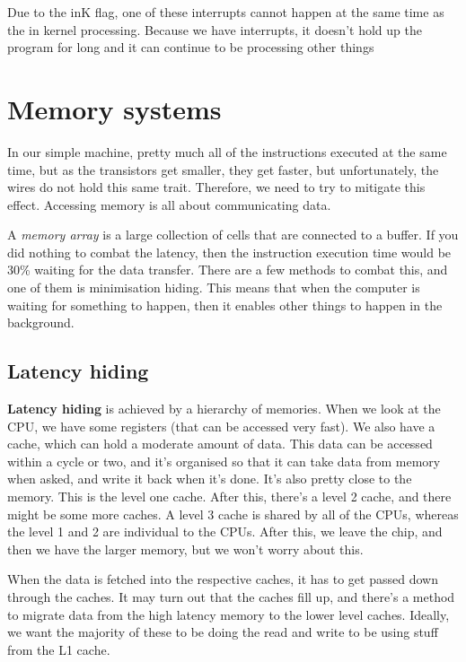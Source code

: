 \documentclass[11pt,a4paper,titlepage,dvipsnames,cmyk]{scrartcl}
\begin{document}
Due to the inK flag, one of these interrupts cannot happen at the same
time as the in kernel processing. Because we have interrupts, it doesn't
hold up the program for long and it can continue to be processing other
things

\section{Memory systems}%
\label{sec:Memory systems}
In our simple machine, pretty much all of the instructions executed at the
same time, but as the transistors get smaller, they get faster, but
unfortunately, the wires do not hold this same trait. Therefore, we need
to try to mitigate this effect. Accessing memory is all about
communicating data.

A \textit{memory array} is a large collection of cells that are connected
to a buffer. If you did nothing to combat the latency, then the
instruction execution time would be 30\% waiting for the data transfer.
There are a few methods to combat this, and one of them is minimisation
hiding. This means that when the computer is waiting for something to
happen, then it enables other things to happen in the background.

\subsection{Latency hiding}%
\label{sub:Latency hiding}

\textbf{Latency hiding} is achieved by a hierarchy of memories. When we
look at the CPU, we have some registers (that can be accessed very fast).
We also have a cache, which can hold a moderate amount of data. This data
can be accessed within a cycle or two, and it's organised so that it can
take data from memory when asked, and write it back when it's done. It's
also pretty close to the memory. This is the level one cache. After this,
there's a level 2 cache, and there might be some more caches. A level 3
cache is shared by all of the CPUs, whereas the level 1 and 2 are
individual to the CPUs. After this, we leave the chip, and then we have
the larger memory, but we won't worry about this.

When the data is fetched into the respective caches, it has to get passed
down through the caches. It may turn out that the caches fill up, and
there's a method to migrate data from the high latency memory to the lower
level caches. Ideally, we want the majority of these to be doing the read
and write to be using stuff from the L1 cache.
\end{document}
